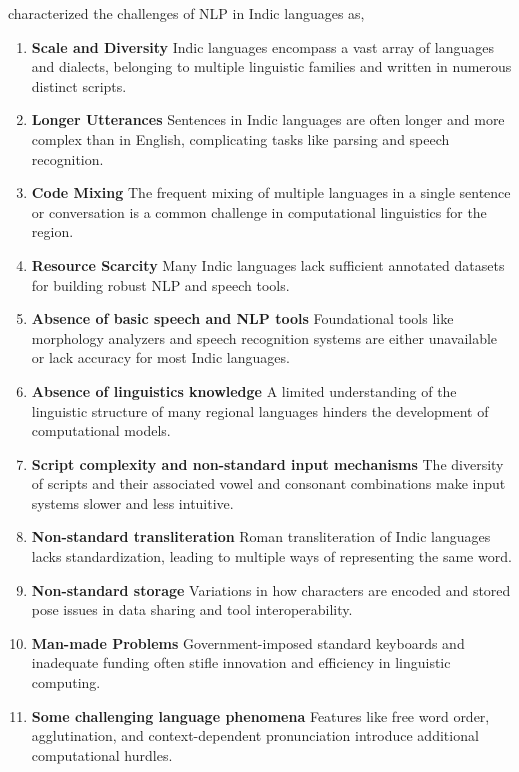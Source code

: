 \citet{bhattacharyya2019indic} characterized the challenges of NLP in Indic
languages as,
\begin{enumerate} \item \textbf{Scale and Diversity}
  Indic languages encompass a vast array of languages and dialects, belonging to multiple linguistic families and written in numerous distinct scripts.
  \item \textbf{Longer Utterances}
    Sentences in Indic languages are often longer and more complex than in English, complicating tasks like parsing and speech recognition.
  \item \textbf{Code Mixing}
    The frequent mixing of multiple languages in a single sentence or conversation is a common challenge in computational linguistics for the region.
  \item \textbf{Resource Scarcity}
    Many Indic languages lack sufficient annotated datasets for building robust NLP and speech tools.
  \item \textbf{Absence of basic speech and NLP tools}
    Foundational tools like morphology analyzers and speech recognition systems are either unavailable or lack accuracy for most Indic languages.
  \item \textbf{Absence of linguistics knowledge}
    A limited understanding of the linguistic structure of many regional languages hinders the development of computational models.
  \item \textbf{Script complexity and non-standard input mechanisms}
    The diversity of scripts and their associated vowel and consonant combinations make input systems slower and less intuitive.
  \item \textbf{Non-standard transliteration}
    Roman transliteration of Indic languages lacks standardization, leading to multiple ways of representing the same word.
  \item \textbf{Non-standard storage}
    Variations in how characters are encoded and stored pose issues in data sharing and tool interoperability.
  \item \textbf{Man-made Problems}
    Government-imposed standard keyboards and inadequate funding often stifle innovation and efficiency in linguistic computing.
  \item \textbf{Some challenging language phenomena}
    Features like free word order, agglutination, and context-dependent pronunciation introduce additional computational hurdles.
\end{enumerate}





